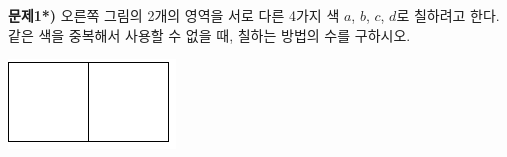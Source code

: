 \documentclass[a4paper]{oblivoir}
\begin{document}
\bigskip\noindent
%
\begin{minipage}{.65\textwidth}
\textbf{문제1*)}
오른쪽 그림의 2개의 영역을 서로 다른 4가지 색 \(a\), \(b\), \(c\), \(d\)로 칠하려고 한다.
같은 색을 중복해서 사용할 수 없을 때, 칠하는 방법의 수를 구하시오.
\end{minipage}
\quad
\begin{minipage}{.25\textwidth}
\includegraphics[width=.5\textwidth]{1}
\end{minipage}
\end{document}
